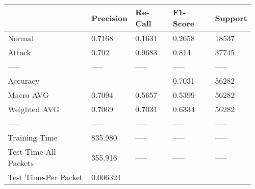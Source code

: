 \begin{tabular}{lllll}
\toprule
{} & Precision & Re-Call & F1-Score & Support \\
\midrule
Normal                &    0.7168 &  0.1631 &   0.2658 &   18537 \\
Attack                &     0.702 &  0.9683 &    0.814 &   37745 \\
-----                 &     ----- &   ----- &    ----- &   ----- \\
Accuracy              &           &         &   0.7031 &   56282 \\
Macro AVG             &    0.7094 &  0.5657 &   0.5399 &   56282 \\
Weighted AVG          &    0.7069 &  0.7031 &   0.6334 &   56282 \\
-----                 &     ----- &   ----- &    ----- &   ----- \\
Training Time         &   835.980 &   ----- &    ----- &   ----- \\
Test Time-All Packets &   355.916 &   ----- &    ----- &   ----- \\
Test Time-Per Packet  &  0.006324 &   ----- &    ----- &   ----- \\
\bottomrule
\end{tabular}
